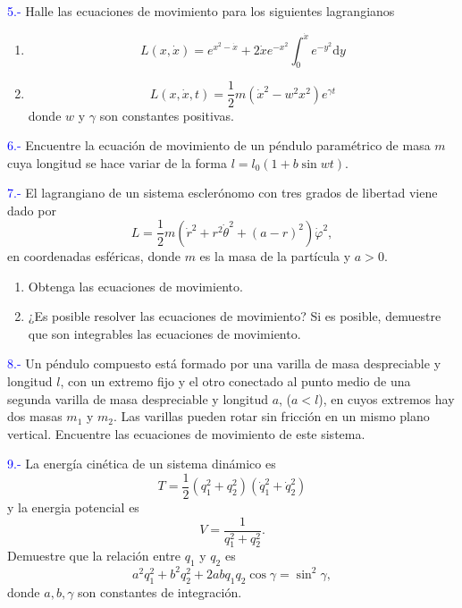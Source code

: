 \documentclass[../main]{subfiles}
\begin{document}
\textcolor{blue}{5.-} Halle las ecuaciones de movimiento para los siguientes lagrangianos
\begin{enumerate}[label=(\alph*)]
    \item 
    \begin{equation*}
        L(x,\dot{x})=e^{x^2-\dot{x}}+2\dot{x}e^{-x^2}\int_0^{\dot{x}}e^{-y^2}\mathrm{d}y   
    \end{equation*}
    \item 
    \begin{equation*}
        L(x,\dot{x},t)=\dfrac{1}{2}m(\dot{x}^2-w^2x^2)e^{\gamma t}
    \end{equation*}
    donde $w$ y $\gamma$ son constantes positivas.
\end{enumerate}

\textcolor{blue}{6.-} Encuentre la ecuación de movimiento de un péndulo paramétrico de masa $m$ cuya longitud se hace variar de la forma $l=l_0(1+b\sin wt)$.

\textcolor{blue}{7.-} El lagrangiano de un sistema esclerónomo con tres grados de libertad viene dado por
\begin{equation*}
    L=\dfrac{1}{2}m(\dot{r}^2+r^2\dot{\theta}^2+(a-r)^2)\dot{\varphi}^2,
\end{equation*}
en coordenadas esféricas, donde $m$ es la masa de la partícula y $a>0$.
\begin{enumerate}[label=(\alph*)]
    \item Obtenga las ecuaciones de movimiento.
    \item ¿Es posible resolver las ecuaciones de movimiento? Si es posible, demuestre que son integrables las ecuaciones de movimiento.
\end{enumerate}

\textcolor{blue}{8.-} Un péndulo compuesto está formado por una varilla de masa despreciable y longitud $l$, con un extremo fijo y el otro conectado al punto medio de una segunda varilla de masa despreciable y longitud $a$, ($a<l$), en cuyos extremos hay dos masas $m_1$ y $m_2$. Las varillas pueden rotar sin fricción en un mismo plano vertical. Encuentre las ecuaciones de movimiento de este sistema.

\textcolor{blue}{9.-} La energía cinética de un sistema dinámico es
\begin{equation*}
    T=\dfrac{1}{2}(q^2_1+q^2_2)(\dot{q}^2_1+\dot{q}^2_2)
\end{equation*}
y la energia potencial es
\begin{equation*}
    V=\dfrac{1}{q^2_1+q^2_2}.
\end{equation*}
Demuestre que la relación entre $q_1$ y $q_2$ es
\begin{equation*}
    a^2q^2_1+b^2q^2_2+2abq_1q_2 \cos \gamma=\sin^2 \gamma,
\end{equation*}
donde $a,b, \gamma$ son constantes de integración.
\end{document}
